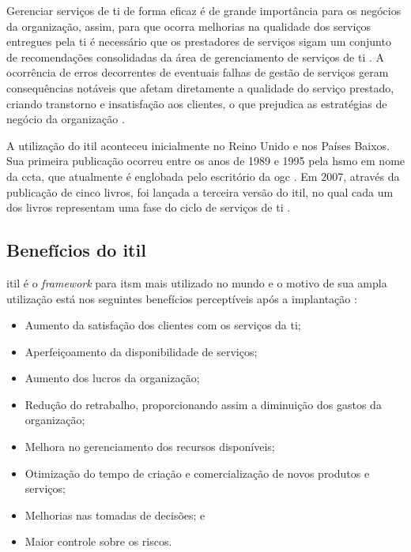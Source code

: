 Gerenciar serviços de \acrshort{ti} de forma eficaz é de grande importância para os negócios da organização, assim, para que ocorra melhorias na qualidade dos serviços entregues pela \acrshort{ti} é necessário que os prestadores de serviços sigam um conjunto de recomendações consolidadas da área de gerenciamento de serviços de \acrshort{ti} \cite{introductoryoverviewofitil}. A ocorrência de erros decorrentes de eventuais falhas de gestão de serviços geram consequências notáveis que afetam diretamente a qualidade do serviço prestado, criando transtorno e insatisfação aos clientes, o que prejudica as estratégias de negócio da organização \cite{introductoryoverviewofitil}.

A utilização do \acrshort{itil} aconteceu inicialmente no Reino Unido e nos Países Baixos. Sua primeira publicação ocorreu entre os anos de 1989 e 1995 pela \gls{hsmo} em nome da \gls{ccta}, que atualmente é englobada pelo escritório da \gls{ogc} \cite{introductoryoverviewofitil}. Em 2007, através da publicação de cinco livros, foi lançada a terceira versão do \acrshort{itil}, no qual cada um dos livros representam uma fase do ciclo de serviços de \acrshort{ti} \cite{introductoryoverviewofitil}.

\subsection{Benefícios do \acrshort{itil}}

\noindent \acrshort{itil} é o \textit{framework} para \acrshort{itsm} mais utilizado no mundo e o motivo de sua ampla utilização está nos seguintes benefícios perceptíveis após a implantação \cite{servicestrategy, introductoryoverviewofitil, itilbaseditservicemanagementmeasurementsystem}:

\begin{itemize}
    \item Aumento da satisfação dos clientes com os serviços da \acrshort{ti};
    \item Aperfeiçoamento da disponibilidade de serviços;
    \item Aumento dos lucros da organização;
    \item Redução do retrabalho, proporcionando assim a diminuição dos gastos da organização;
    \item Melhora no gerenciamento dos recursos disponíveis;
    \item Otimização do tempo de criação e comercialização de novos produtos e serviços;
    \item Melhorias nas tomadas de decisões; e
    \item Maior controle sobre os riscos.
\end{itemize}

